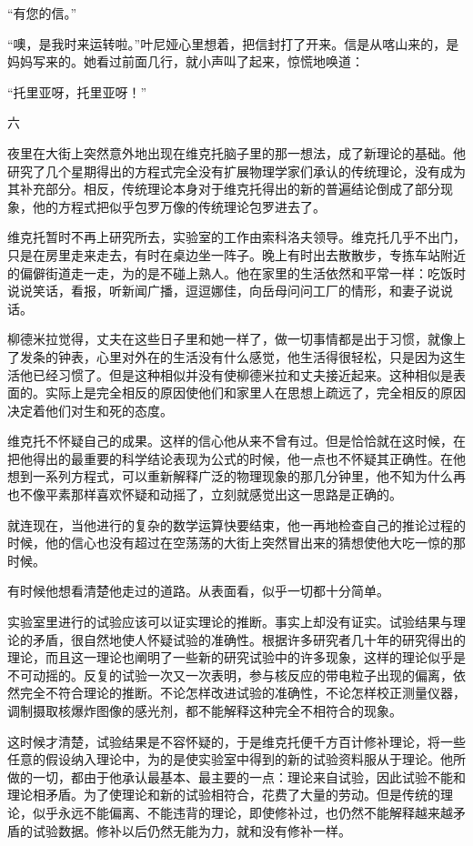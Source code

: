 “有您的信。”

“噢，是我时来运转啦。”叶尼娅心里想着，把信封打了开来。信是从喀山来的，是妈妈写来的。她看过前面几行，就小声叫了起来，惊慌地唤道：

“托里亚呀，托里亚呀！”

六

夜里在大街上突然意外地出现在维克托脑子里的那一想法，成了新理论的基础。他研究了几个星期得出的方程式完全没有扩展物理学家们承认的传统理论，没有成为其补充部分。相反，传统理论本身对于维克托得出的新的普遍结论倒成了部分现象，他的方程式把似乎包罗万像的传统理论包罗进去了。

维克托暂时不再上研究所去，实验室的工作由索科洛夫领导。维克托几乎不出门，只是在房里走来走去，有时在桌边坐一阵子。晚上有时出去散散步，专拣车站附近的偏僻街道走一走，为的是不碰上熟人。他在家里的生活依然和平常一样：吃饭时说说笑话，看报，听新闻广播，逗逗娜佳，向岳母问问工厂的情形，和妻子说说话。

柳德米拉觉得，丈夫在这些日子里和她一样了，做一切事情都是出于习惯，就像上了发条的钟表，心里对外在的生活没有什么感觉，他生活得很轻松，只是因为这生活他已经习惯了。但是这种相似并没有使柳德米拉和丈夫接近起来。这种相似是表面的。实际上是完全相反的原因使他们和家里人在思想上疏远了，完全相反的原因决定着他们对生和死的态度。

维克托不怀疑自己的成果。这样的信心他从来不曾有过。但是恰恰就在这时候，在把他得出的最重要的科学结论表现为公式的时候，他一点也不怀疑其正确性。在他想到一系列方程式，可以重新解释广泛的物理现象的那几分钟里，他不知为什么再也不像平素那样喜欢怀疑和动摇了，立刻就感觉出这一思路是正确的。

就连现在，当他进行的复杂的数学运算快要结束，他一再地检查自己的推论过程的时候，他的信心也没有超过在空荡荡的大街上突然冒出来的猜想使他大吃一惊的那时候。

有时候他想看清楚他走过的道路。从表面看，似乎一切都十分简单。

实验室里进行的试验应该可以证实理论的推断。事实上却没有证实。试验结果与理论的矛盾，很自然地使人怀疑试验的准确性。根据许多研究者几十年的研究得出的理论，而且这一理论也阐明了一些新的研究试验中的许多现象，这样的理论似乎是不可动摇的。反复的试验一次又一次表明，参与核反应的带电粒子出现的偏离，依然完全不符合理论的推断。不论怎样改进试验的准确性，不论怎样校正测量仪器，调制摄取核爆炸图像的感光剂，都不能解释这种完全不相符合的现象。

这时候才清楚，试验结果是不容怀疑的，于是维克托便千方百计修补理论，将一些任意的假设纳入理论中，为的是使实验室中得到的新的试验资料服从于理论。他所做的一切，都由于他承认最基本、最主要的一点：理论来自试验，因此试验不能和理论相矛盾。为了使理论和新的试验相符合，花费了大量的劳动。但是传统的理论，似乎永远不能偏离、不能违背的理论，即使修补过，也仍然不能解释越来越矛盾的试验数据。修补以后仍然无能为力，就和没有修补一样。

